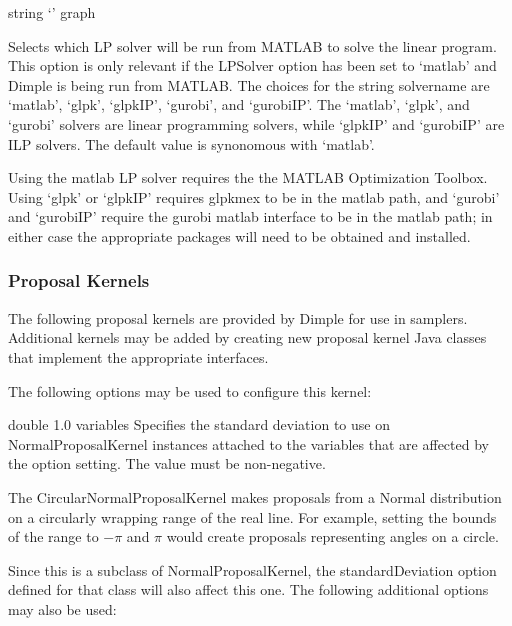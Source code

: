 
{string}
{`'}
{graph}
{Selects which LP solver will be run from MATLAB to solve the linear program. This option is only relevant if the LPSolver option has been set to `matlab' and Dimple is being run from MATLAB. The choices for the string solvername are `matlab', `glpk', `glpkIP', `gurobi', and `gurobiIP'. The `matlab', `glpk', and `gurobi' solvers are linear programming solvers, while `glpkIP' and `gurobiIP' are ILP solvers. The default value is synonomous with `matlab'.

Using the matlab LP solver requires the the MATLAB Optimization Toolbox. Using `glpk' or `glpkIP' requires glpkmex to be in the matlab path, and `gurobi' and `gurobiIP' require the gurobi matlab interface to be in the matlab path; in either case the appropriate packages will need to be obtained and installed.
}

\clearpage
\subsubsection{Proposal Kernels}
\label{sec:ProposalKernels}

The following proposal kernels are provided by Dimple for use in samplers. Additional kernels may be added by creating new proposal kernel Java classes that implement the appropriate interfaces.

\label{sec:NormalProposalKernel}

The following options may be used to configure this kernel:


{double}
{1.0}
{variables}
{Specifies the standard deviation to use on NormalProposalKernel instances attached to the variables that are affected by the option setting. The value must be non-negative.}

\label{sec:CircularNormalProposalKernel}

The CircularNormalProposalKernel makes proposals from a Normal distribution on a circularly wrapping range of the real line.  For example, setting the bounds of the range to $-\pi$ and $\pi$ would create proposals representing angles on a circle.

Since this is a subclass of NormalProposalKernel, the standardDeviation option defined for that class will also affect this one. The following additional options may also be used:

